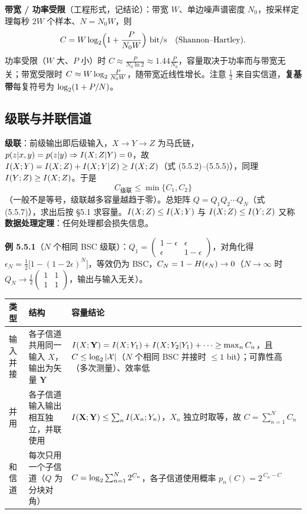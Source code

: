 \textbf{带宽 / 功率受限}（工程形式，记结论）：带宽 $W$、单边噪声谱密度 $N_0$，按采样定理每秒 $2W$ 个样本、$N=N_0W$，则
\begin{equation*}
C=W\lb\Bigl(1+\frac{P}{N_0W}\Bigr)\ \text{bit/s}\quad(\text{Shannon--Hartley}).
\end{equation*}
功率受限（$W$ 大、$P$ 小）时 $C\approx\frac{P}{N_0\ln2}\approx1.44\frac{P}{N_0}$，容量取决于功率而与带宽无关；带宽受限时 $C\approx W\log_{2}\frac{P}{N_0W}$，随带宽近线性增长。注意 $\frac12$ 来自实信道，\textbf{复基带}每复符号为 $\log_{2}(1+P/N)$。

\subsection{级联与并联信道}

\textbf{级联}：前级输出即后级输入，$X\to Y\to Z$ 为马氏链，$p\!\left(z|x,y\right)=p\!\left(z|y\right)\Rightarrow I\!\left(X;Z|Y\right)=0$，故
$I\!\left(X;Y\right)=I\!\left(X;Z\right)+I\!\left(X;Y|Z\right)\ge I\!\left(X;Z\right)$（式 (5.5.2)--(5.5.5)），同理 $I\!\left(Y;Z\right)\ge I\!\left(X;Z\right)$。于是
\begin{equation*}
\boxed{\,C_{\text{级联}}\le\min\{C_1,C_2\}\,}
\end{equation*}
（一般不是等号，级联越多容量越趋于零）。总矩阵 $Q=Q_1Q_2\cdots Q_N$（式 (5.5.7)），求出后按 \S5.1 求容量。$I\!\left(X;Z\right)\le I\!\left(X;Y\right)$ 与 $I\!\left(X;Z\right)\le I\!\left(Y;Z\right)$ 又称\textbf{数据处理定理}：任何处理都会损失信息。

\textbf{例 5.5.1}（$N$ 个相同 BSC 级联）：$Q_1=\begin{pmatrix}1-\epsilon&\epsilon\\\epsilon&1-\epsilon\end{pmatrix}$，对角化得
$\epsilon_N=\frac12\bigl[1-(1-2\epsilon)^N\bigr]$，等效仍为 BSC，$C_N=1-H\!\left(\epsilon_N\right)\to0$（$N\to\infty$ 时 $Q_N\to\frac12\begin{pmatrix}1&1\\1&1\end{pmatrix}$，输出与输入无关）。

\begin{center}\small
\begin{tabular}{@{}p{1.9cm}p{4.4cm}p{8.9cm}@{}}
\toprule
类型 & 结构 & 容量结论\\
\midrule
输入并接 & 各子信道共用同一输入 $X$，输出为矢量 $\mathbf{Y}$ &
$I\!\left(X;\mathbf{Y}\right)=I\!\left(X;Y_1\right)+I\!\left(X;Y_2|Y_1\right)+\cdots\ge\max_nC_n$，且 $C\le\log_{2}|\mathcal{X}|$（$N$ 个相同 BSC 并接时 $\le1$ bit）；可靠性高（多次测量）、效率低\\
并用 & 各子信道输入输出相互独立，并联使用 &
$I\!\left(\mathbf{X};\mathbf{Y}\right)\le\sum_nI\!\left(X_n;Y_n\right)$，$X_n$ 独立时取等，故 $C=\sum_{n=1}^NC_n$\\
和信道 & 每次只用一个子信道（$Q$ 为分块对角） &
$C=\log_{2}\sum_{n=1}^N2^{C_n}$，各子信道使用概率 $p_n(C)=2^{\,C_n-C}$\\
\bottomrule
\end{tabular}
\end{center}

